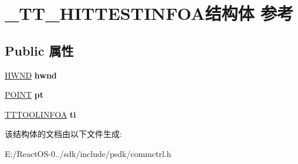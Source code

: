 \hypertarget{struct___t_t___h_i_t_t_e_s_t_i_n_f_o_a}{}\section{\+\_\+\+T\+T\+\_\+\+H\+I\+T\+T\+E\+S\+T\+I\+N\+F\+O\+A结构体 参考}
\label{struct___t_t___h_i_t_t_e_s_t_i_n_f_o_a}
\subsection*{Public 属性}
\begin{DoxyCompactItemize}
\item 
\mbox{\label{struct___t_t___h_i_t_t_e_s_t_i_n_f_o_a_a595d955a5c36ed1ef2d26f49c7351077}} 
\hyperlink{interfacevoid}{H\+W\+ND} {\bfseries hwnd}
\item 
\mbox{\label{struct___t_t___h_i_t_t_e_s_t_i_n_f_o_a_a1239b5ccad8ebeea287f0f97e5c91dbd}} 
\hyperlink{structtag_p_o_i_n_t}{P\+O\+I\+NT} {\bfseries pt}
\item 
\mbox{\label{struct___t_t___h_i_t_t_e_s_t_i_n_f_o_a_ab85f4a903ae325f3a4205149397d0930}} 
\hyperlink{structtag_t_o_o_l_i_n_f_o_a}{T\+T\+T\+O\+O\+L\+I\+N\+F\+OA} {\bfseries ti}
\end{DoxyCompactItemize}


该结构体的文档由以下文件生成\+:\begin{DoxyCompactItemize}
\item 
E\+:/\+React\+O\+S-\/0../sdk/include/psdk/commctrl.\+h\end{DoxyCompactItemize}
